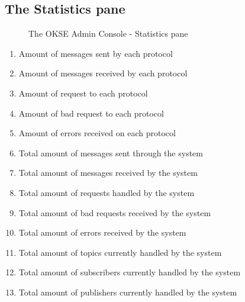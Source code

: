 \subsection{The Statistics pane}
\begin{center}
  \begin{figure}[ht!]
    \caption{The OKSE Admin Console - Statistics pane} 
    \label{fig:OKSE Admin Console - Statistics pane}
  \end{figure}
\end{center}
\begin{enumerate}
\item Amount of messages sent by each protocol
\item Amount of messages received by each protocol
\item Amount of request to each protocol
\item Amount of bad request to each protocol
\item Amount of errors received on each protocol
\item Total amount of messages sent through the system
\item Total amount of messages received by the system
\item Total amount of requests handled by the system
\item Total amount of bad requests received by the system
\item Total amount of errors received by the system
\item Total amount of topics currently handled by the system
\item Total amount of subscribers currently handled by the system
\item Total amount of publishers currently handled by the system
\end{enumerate}
